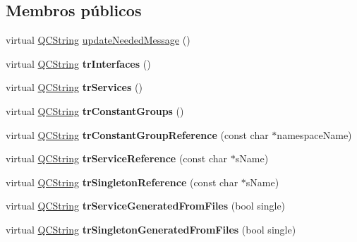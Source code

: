 \subsection*{Membros públicos}
\begin{DoxyCompactItemize}
\item 
virtual \hyperlink{class_q_c_string}{Q\-C\-String} \hyperlink{class_translator_adapter__1__8__4_aa2c053398a494e36caf5152d9a4fc6cf}{update\-Needed\-Message} ()
\item 
\hypertarget{class_translator_adapter__1__8__4_a3e32b2fdb1d61783cd0fa4734beed3da}{virtual \hyperlink{class_q_c_string}{Q\-C\-String} {\bfseries tr\-Interfaces} ()}\label{class_translator_adapter__1__8__4_a3e32b2fdb1d61783cd0fa4734beed3da}

\item 
\hypertarget{class_translator_adapter__1__8__4_a0a0aa68d1d3b75a4b3dd395c7b624f64}{virtual \hyperlink{class_q_c_string}{Q\-C\-String} {\bfseries tr\-Services} ()}\label{class_translator_adapter__1__8__4_a0a0aa68d1d3b75a4b3dd395c7b624f64}

\item 
\hypertarget{class_translator_adapter__1__8__4_a92c2fd6605d059463589fcef7b1cea79}{virtual \hyperlink{class_q_c_string}{Q\-C\-String} {\bfseries tr\-Constant\-Groups} ()}\label{class_translator_adapter__1__8__4_a92c2fd6605d059463589fcef7b1cea79}

\item 
\hypertarget{class_translator_adapter__1__8__4_afee1f6e0599fe1d0938c65e7adce44ba}{virtual \hyperlink{class_q_c_string}{Q\-C\-String} {\bfseries tr\-Constant\-Group\-Reference} (const char $\ast$namespace\-Name)}\label{class_translator_adapter__1__8__4_afee1f6e0599fe1d0938c65e7adce44ba}

\item 
\hypertarget{class_translator_adapter__1__8__4_ade4a083ba7d9b0c1317c6c36f5bce96c}{virtual \hyperlink{class_q_c_string}{Q\-C\-String} {\bfseries tr\-Service\-Reference} (const char $\ast$s\-Name)}\label{class_translator_adapter__1__8__4_ade4a083ba7d9b0c1317c6c36f5bce96c}

\item 
\hypertarget{class_translator_adapter__1__8__4_a548555333d671f53e736a598b1d797a0}{virtual \hyperlink{class_q_c_string}{Q\-C\-String} {\bfseries tr\-Singleton\-Reference} (const char $\ast$s\-Name)}\label{class_translator_adapter__1__8__4_a548555333d671f53e736a598b1d797a0}

\item 
\hypertarget{class_translator_adapter__1__8__4_ab5801f97b602eaa907d969d8cc05be08}{virtual \hyperlink{class_q_c_string}{Q\-C\-String} {\bfseries tr\-Service\-Generated\-From\-Files} (bool single)}\label{class_translator_adapter__1__8__4_ab5801f97b602eaa907d969d8cc05be08}

\item 
\hypertarget{class_translator_adapter__1__8__4_aefe3e3adb305c5ae4ea863f4586ab0f0}{virtual \hyperlink{class_q_c_string}{Q\-C\-String} {\bfseries tr\-Singleton\-Generated\-From\-Files} (bool single)}\label{class_translator_adapter__1__8__4_aefe3e3adb305c5ae4ea863f4586ab0f0}

\end{DoxyCompactItemize}
